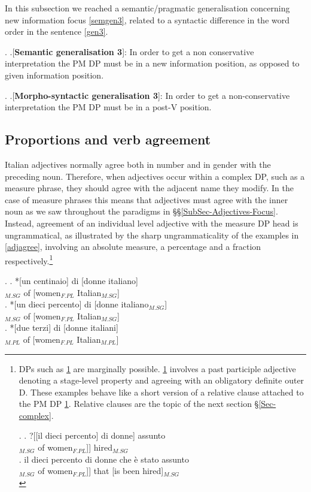 \documentclass[charis, linguex]{glossa}
\begin{document}
In this subsection we reached a semantic/pragmatic generalisation concerning new information focus \ref{semgen3}, related to a syntactic difference in the word order in the sentence \ref{gen3}. 

\ex. \label{semgen3} \a.[{\bf Semantic generalisation 3}]: In order to get a non conservative interpretation the PM DP must be in a new information position, as opposed to given information position. 

\ex. \label{gen3} \a.[{\bf Morpho-syntactic generalisation 3}]:  In order to get a non-conservative interpretation the PM DP must be in a post-V position. 


\subsection{Proportions and verb agreement} \label{Sub-Sec-VerbAgreement}

Italian adjectives normally agree both in number and in gender with the preceding noun. Therefore, when adjectives occur within a complex DP, such as a measure phrase, they should agree with the adjacent name they modify. In the case of measure phrases this means that adjectives must agree with the inner noun as we saw throughout the paradigms in \S\S\ref{SubSec-Adjectives-Focus}. Instead, agreement of an individual level adjective with the measure DP head is ungrammatical, as illustrated by the sharp ungrammaticality of the examples in \ref{adjagree}, involving an absolute measure, a percentage and a fraction respectively.\footnote{\label{adjdiscussion}DPs such as \ref{Available} are marginally possible. \ref{Available} involves a past participle adjective denoting a stage-level property and agreeing with an obligatory definite outer D. These examples behave like a short version of a relative clause attached to the PM DP \ref{Availableb}. Relative clauses are the topic of the next section \S\ref{Sec-complex}.

\ex. \ag. ?[[il dieci percento] di donne] assunto \\ 
          [[the ten percent]$_{M.SG}$  of women$_{F.PL}$]] hired$_{M.SG}$  \label{Available} \\
       \bg. il dieci percento di donne che è stato assunto \\  
	      [[the ten percent]$_{M.SG}$  of women$_{F.PL}$]] that [is been  hired]$_{M.SG}$ \label{Availableb} \\

}


\ex. \label{adjagree}  
    \ag. *[un centinaio] di [donne italiano] \\ 
           [about {a hundred}]$_{M.SG}$  of [women$_{F.PL}$ Italian$_{M.SG}$] \\ 
    \bg. *[un dieci percento]  di [donne italiano$_{M.SG}$] \\ 
           [about ten percent]$_{M.SG}$  of [women$_{F.PL}$ Italian$_{M.SG}$] \\ 
    \cg. *[due terzi] di [donne italiani] \\
	       [two thirds]$_{M.PL}$ of [women$_{F.PL}$ Italian$_{M.PL}$] \\
 
\end{document}
